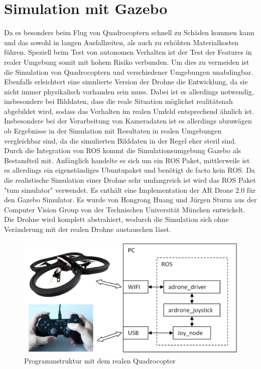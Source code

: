 \section{Simulation mit Gazebo}
Da es besonders beim Flug von Quadrocoptern schnell zu Schäden kommen kann und das sowohl  in langen Ausfallzeiten, als auch zu erhöhten Materialkosten führen. Speziell beim Test von autonomen Verhalten ist der Test der Features in realer Umgebung somit mit hohem Risiko verbunden. Um dies zu vermeiden ist die Simulation von Quadrocoptern und verschiedener Umgebungen unabdingbar. Ebenfalls erleichtert eine simulierte Version der Drohne die Entwicklung, da sie nicht immer physikalisch vorhanden sein muss. Dabei ist es allerdings notwendig, insbesondere
bei Bilddaten, dass die reale Situation möglichst realitätsnah abgebildet wird, sodass
das Verhalten im realen Umfeld entsprechend ähnlich ist. Insbesondere bei der
Verarbeitung von Kameradaten ist es allerdings abzuwägen ob Ergebnisse in der Simulation
mit Resultaten in realen Umgebungen vergleichbar sind, da die simulierten
Bilddaten in der Regel eher steril sind.\newline
Durch die Integration von ROS kommt die Simulationsumgebung Gazebo als Bestandteil
mit. Anfänglich handelte es sich um ein ROS Paket, mittlerweile ist es allerdings
ein eigenständiges Ubuntupaket und benötigt de facto kein ROS.
\newline
Da die realistische Simulation einer Drohne sehr umfangreich ist wird das ROS Paket "tum simulator" verwendet. Es enthält eine Implementation der AR Drone 2.0 für den Gazebo Simulator. Es wurde von Hongrong Huang und Jürgen Sturm
 aus der Computer Vision Group von der Technischen Universität München entwickelt. Die Drohne wird komplett abstrahiert, wodurch die Simulation sich ohne Veränderung mit der realen Drohne austauschen lässt. 
 \begin{figure}[ht]
 	\centering
 	\includegraphics[scale=0.9]{Bilder/real_structure.png}
 	\caption[Programmstruktur mit dem realen Quadrocopter]{Programmstruktur mit dem realen Quadrocopter}
 	
 \end{figure}

